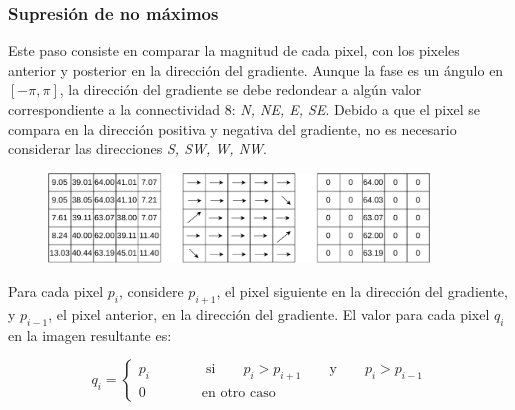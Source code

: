 \begin{frame}\frametitle{Supresión de no máximos}
  Este paso consiste en comparar la magnitud de cada pixel, con los pixeles anterior y posterior en la dirección del gradiente.
  Aunque la fase es un ángulo en $[-\pi, \pi]$, la dirección del gradiente se debe redondear a algún valor correspondiente a la connectividad 8: \textit{N, NE, E, SE}. Debido a que el pixel se compara en la dirección positiva y negativa del gradiente, no es necesario considerar las direcciones \textit{S, SW, W, NW}.
  \begin{figure}
    \centering
    \includegraphics[width=0.9\textwidth]{Figures/SobelMA.pdf}
  \end{figure}
  Para cada pixel $p_i$, considere $p_{i+1}$, el pixel siguiente en la dirección del gradiente, y $p_{i-1}$, el pixel anterior, en la dirección del gradiente. El valor para cada pixel $q_i$ en la imagen resultante es:
  
  \[q_i = \begin{cases}p_i\qquad\qquad\textrm{si}\qquad p_i > p_{i+1} \qquad\textrm{y}\qquad p_i > p_{i-1}\\
  0\qquad\qquad\textrm{en otro caso}\end{cases}\]
\end{frame}

